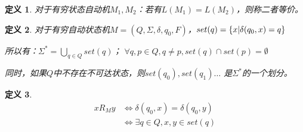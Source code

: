 \documentclass{ctexart}
\newtheorem{definition}{定义}[section]
\DeclarePairedDelimiter{\set}{\{}{\}}
\begin{document}
\begin{definition}
    对于有穷状态自动机$M_1, M_2$：若有$L(M_1) = L(M_2)$，则称二者等价。
\end{definition}

\begin{definition}
    对于有穷自动状态机$M = (Q, \Sigma, \delta, q_0, F)$，$set(q) = 
    \set*{x | \delta(q_0, x) = q}$

    所以有：$\Sigma^* = \bigcup_{q \in Q}set(q)$；
    $\forall q,p \in Q, q \ne p, set(q) \cap set(p) = \emptyset $

    同时，如果$Q$中不存在不可达状态，则$set(q_0), set(q_1) \dots$
    是$\Sigma^*$的一个划分。
\end{definition}

\begin{definition}
    \begin{align*}
        x R_M y & \iff \delta(q_0, x) = \delta(q_0, y) \\
            & \iff \exists q \in Q, x, y \in set(q)
    \end{align*}
\end{definition}
\end{document}
